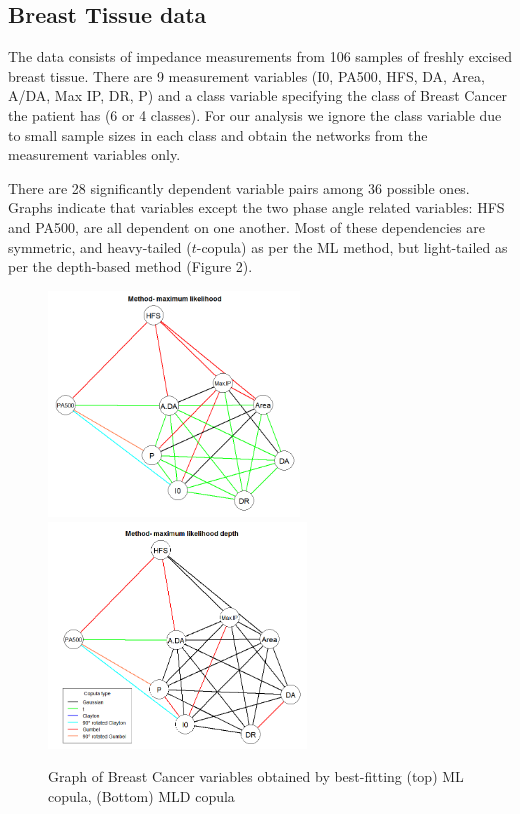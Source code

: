 \documentclass[11pt]{llncs}
\begin{document}
\subsection{Breast Tissue data}The data consists of impedance measurements from 106 samples of freshly excised breast tissue. There are 9 measurement variables (I0, PA500, HFS, DA, Area, A/DA, Max IP, DR, P) and a class variable specifying the class of Breast Cancer the patient has (6 or 4 classes). For our analysis we ignore the class variable due to small sample sizes in each class and obtain the networks from the measurement variables only.

There are 28 significantly dependent variable pairs among 36 possible ones. Graphs indicate that variables except the two phase angle related variables: HFS and PA500, are all dependent on one another. Most of these dependencies are symmetric, and  heavy-tailed ($t$-copula) as per the ML method, but light-tailed as per the depth-based method (Figure 2).

\begin{figure}[H]
	\centering
		\includegraphics[height=6cm]{cancer_graph_ml.png}\\
		\includegraphics[height=6cm]{cancer_graph_md.png}
	\label{fig:fig2}
	\caption{Graph of Breast Cancer variables obtained by best-fitting (top) ML copula, (Bottom) MLD copula}
\end{figure}
\end{document}
